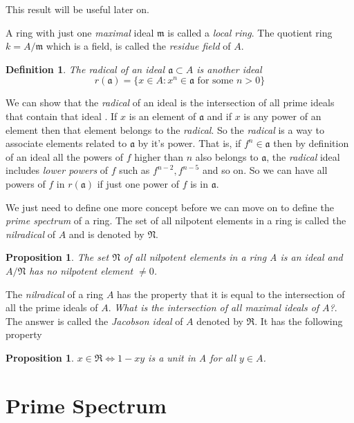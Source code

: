 \documentclass[]{report}
\newtheorem{prop}[theorem]{Proposition}
\newtheorem{defn}[theorem]{Definition}
\begin{document}
This result will be useful later on.

A ring with just one \textit{maximal} ideal $\mathfrak{m}$ is called a \textit{local ring}. The quotient ring $k = A/\mathfrak{m}$ which is a field, is called the \textit{residue field} of $A$. 

\begin{defn}
    The radical of an ideal $\mathfrak{a}\subset A$ is another ideal 
    $$r(\mathfrak{a}) = \{x\in A: x^n\in \mathfrak{a} \text{ for some } n>0\}$$
\end{defn}

We can show that the \textit{radical} of an ideal is the intersection of all prime ideals that contain that ideal \cite{atiyah1}. If $x$ is an element of $\mathfrak{a}$ and if $x$ is any power of an element then that element belongs to the \textit{radical}. So the \textit{radical} is a way to associate elements related to $\mathfrak{a}$ by it's power. That is, if $f^n\in \mathfrak{a}$ then by definition of an ideal all the powers of $f$ higher than $n$ also belongs to $\mathfrak{a}$, the \textit{radical} ideal includes \textit{lower powers} of $f$ such as $f^{n-2}, f^{n-5}$ and so on. So we can have all powers of $f$ in $r(\mathfrak{a})$ if just one power of $f$ is in $\mathfrak{a}$. 

We just need to define one more concept before we can move on to define the \textit{prime spectrum} of a ring. The set of all nilpotent elements in a ring is called the \textit{nilradical} of $A$ and is denoted by $\mathfrak{N}$.

\begin{prop}
    The set $\mathfrak{N}$ of all nilpotent elements in a ring A is an ideal and $A/\mathfrak{N}$ has no nilpotent element $\neq 0$. \cite{atiyah1}
\end{prop}

The \textit{nilradical} of a ring $A$ has the property that it is equal to the intersection of all the prime ideals of $A$. \textit{What is the intersection of all maximal ideals of $A$?}. The answer is called the \textit{Jacobson ideal} of $A$ denoted by $\mathfrak{R}$. It has the following property

\begin{prop}
    $x\in \mathfrak{R} \Leftrightarrow 1-xy$ is a unit in A for all $y\in A$. \cite{atiyah1}
\end{prop}

\section{Prime Spectrum}
\end{document}
